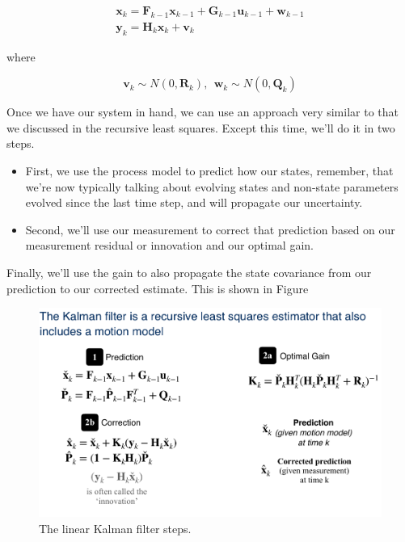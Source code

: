 \begin{eqnarray}
\mathbf{x}_k = \mathbf{F}_{k-1}\mathbf{x}_{k-1} + \mathbf{G}_{k-1}\mathbf{u}_{k-1} + \mathbf{w}_{k-1} \\
\mathbf{y}_k = \mathbf{H}_k \mathbf{x}_k + \mathbf{v}_k
\end{eqnarray}

where

\begin{equation}
\mathbf{v}_k \sim N(0, \mathbf{R}_k), ~~ \mathbf{w}_k \sim N(0, \mathbf{Q}_k) 
\end{equation}

Once we have our system in hand, we can use an approach
very similar to that we discussed in the recursive
least squares. Except this time, we'll
do it in two steps. 

\begin{itemize}
\item First, we use the process model to predict how our states, remember, that we're now typically talking
about evolving states and non-state parameters evolved since the last time step, and will propagate our uncertainty. 
\item Second, we'll use our measurement to correct that prediction based on our measurement residual
or innovation and our optimal gain. 
\end{itemize}

Finally, we'll use the gain to also propagate the state covariance from our prediction
to our corrected estimate. This is shown in Figure

 

\begin{figure}[!htb]
\begin{center}
\includegraphics[scale=0.280]{img/kalman_filter/kalman_2.jpeg}
\end{center}
\caption{The linear Kalman filter steps.}
\label{kalman_2}
\end{figure}


